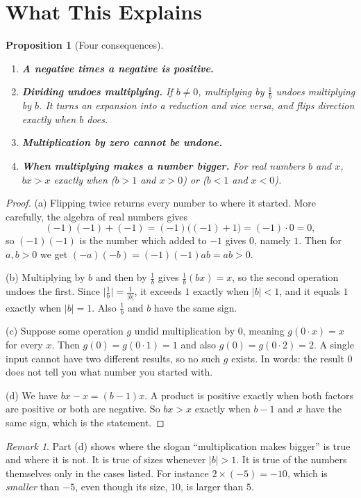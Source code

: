 \documentclass[12pt]{article}
\newtheorem{proposition}{Proposition}
\theoremstyle{definition}
\theoremstyle{remark}
\newtheorem{remark}{Remark}
\begin{document}
\section{What This Explains}
\begin{proposition}[Four consequences]\label{prop:consequences}
\begin{enumerate}
\item[\textup{(a)}] \textbf{A negative times a negative is positive.}
\item[\textup{(b)}] \textbf{Dividing undoes multiplying.} If $b\ne0$, multiplying by $\tfrac1b$ undoes multiplying by $b$. It turns an expansion into a reduction and vice versa, and flips direction exactly when $b$ does.
\item[\textup{(c)}] \textbf{Multiplication by zero cannot be undone.}
\item[\textup{(d)}] \textbf{When multiplying makes a number bigger.} For real numbers $b$ and $x$, $bx>x$ exactly when ($b>1$ and $x>0$) or ($b<1$ and $x<0$).
\end{enumerate}
\end{proposition}

\begin{proof}
(a) Flipping twice returns every number to where it started. More carefully, the algebra of real numbers gives
\[
(-1)(-1)+(-1)=(-1)\bigl((-1)+1\bigr)=(-1)\cdot0=0,
\]
so $(-1)(-1)$ is the number which added to $-1$ gives $0$, namely $1$. Then for $a,b>0$ we get $(-a)(-b)=(-1)(-1)ab=ab>0$.

(b) Multiplying by $b$ and then by $\tfrac1b$ gives $\tfrac1b(bx)=x$, so the second operation undoes the first. Since $\bigl|\tfrac1b\bigr|=\tfrac1{|b|}$, it exceeds $1$ exactly when $|b|<1$, and it equals $1$ exactly when $|b|=1$. Also $\tfrac1b$ and $b$ have the same sign.

(c) Suppose some operation $g$ undid multiplication by $0$, meaning $g(0\cdot x)=x$ for every $x$. Then $g(0)=g(0\cdot1)=1$ and also $g(0)=g(0\cdot2)=2$. A single input cannot have two different results, so no such $g$ exists. In words: the result $0$ does not tell you what number you started with.

(d) We have $bx-x=(b-1)x$. A product is positive exactly when both factors are positive or both are negative. So $bx>x$ exactly when $b-1$ and $x$ have the same sign, which is the statement.
\end{proof}

\begin{remark}
Part (d) shows where the slogan ``multiplication makes bigger'' is true and where it is not. It is true of sizes whenever $|b|>1$. It is true of the numbers themselves only in the cases listed. For instance $2\times(-5)=-10$, which is \emph{smaller} than $-5$, even though its size, $10$, is larger than $5$.
\end{remark}
\end{document}
